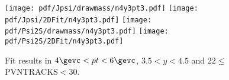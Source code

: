 \begin{figure}[H]
\begin{center}
\texttt{[image: pdf/Jpsi/drawmass/n4y3pt3.pdf]}
\texttt{[image: pdf/Jpsi/2DFit/n4y3pt3.pdf]}
\vspace*{-0.5cm}
\texttt{[image: pdf/Psi2S/drawmass/n4y3pt3.pdf]}
\texttt{[image: pdf/Psi2S/2DFit/n4y3pt3.pdf]}
\vspace*{-0.5cm}
\end{center}
\caption{Fit results in $4\gevc<pt<6\gevc$, $3.5<y<4.5$ and 22$\leq$PVNTRACKS$<$30.}
\label{Fitn4y3pt3}
\end{figure}
